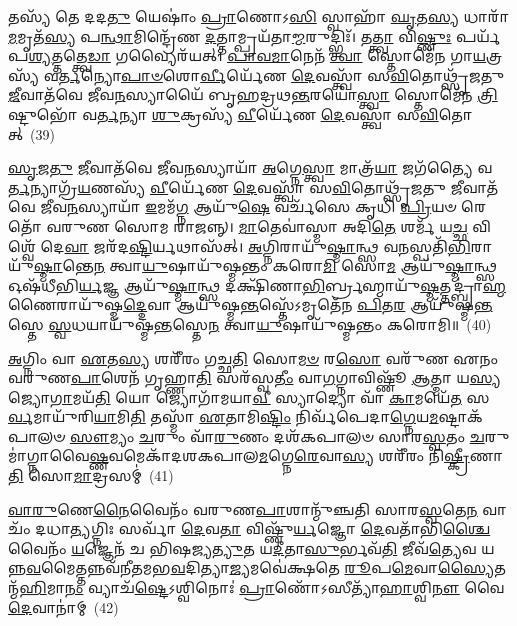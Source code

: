 𑌤𑌸𑍍𑌯᳴ 𑌤𑍇 𑌦𑌦\-\ul{𑌤𑍁} 𑌯𑍇𑌷𑌾𑌂॑ \ul{𑌪𑍍𑌰𑌾}\-𑌣𑍋\-𑌽\-\ul{𑌸𑌿} 𑌸𑍍𑌵𑌾𑌹𑌾᳴ \ul{𑌘𑍃}\-𑌤\-\ul{𑌸𑍍𑌯} 𑌧𑌾𑌰𑌾᳴\-\ul{𑌮}\-𑌮𑍃𑌤᳴\-\ul{𑌸𑍍𑌯} 𑌪\-\ul{𑌨𑍍𑌥𑌾}\-𑌮𑌿𑌨𑍍𑌦𑍍𑌰𑍇᳴𑌣 \ul{𑌦}\-𑌤𑍍𑌤𑌾𑌮𑍍𑌪𑍍𑌰𑌯᳴𑌤𑌾\-\ul{𑌮𑍍𑌮}\-𑌰𑍁𑌦𑍍𑌭𑌿𑌃᳴। 𑌤\-\ul{𑌤𑍍𑌤𑍍𑌵𑌾} 𑌵𑌿\-\ul{𑌷𑍍𑌣𑍁𑌃} 𑌪𑌰𑍍𑌯᳴𑌪\-\ul{𑌶𑍍𑌯}\-𑌤𑍍𑌤𑌤𑍍𑌤𑍍𑌵𑍇\-\ul{𑌡𑌾} 𑌗𑌵𑍍𑌯𑍈𑌰᳴𑌯𑌤𑍍। \ul{𑌪𑌾}\-\-\ul{𑌵}\-\-\ul{𑌮𑌾}\-𑌨𑍇𑌨᳴ \ul{𑌤𑍍𑌵𑌾} 𑌸𑍍𑌤𑍋𑌮𑍇᳴𑌨 𑌗𑌾\-\ul{𑌯}\-𑌤𑍍𑌰𑌸𑍍𑌯᳴ 𑌵\-\ul{𑌰𑍍𑌤}\-𑌨𑍍𑌯𑍋\-\ul{𑌪𑌾}\-\-\ul{𑍞}\-𑌶𑍋\-\ul{𑌰𑍍𑌵𑍀}\-𑌰𑍍𑌯𑍇᳴𑌣 \ul{𑌦𑍇}\-𑌵𑌸𑍍𑌤𑍍𑌵𑌾᳴ 𑌸\-\ul{𑌵𑌿}\-𑌤𑍋𑌥𑍍𑌸𑍃᳴𑌜𑌤𑍁 \ul{𑌜𑍀}\-𑌵𑌾𑌤᳴𑌵𑍇 𑌜𑍀𑌵\-\ul{𑌨}\-𑌸𑍍𑌯𑌾𑌯𑍈᳴ 𑌬𑍃𑌹𑌦𑍍𑌰𑌥\-\ul{𑌨𑍍𑌤}\-𑌰𑌯𑍋॑\-\ul{𑌸𑍍𑌤𑍍𑌵𑌾} 𑌸𑍍𑌤𑍋𑌮𑍇᳴𑌨 \ul{𑌤𑍍𑌰𑌿}\-𑌷𑍍𑌟𑍁𑌭𑍋᳴ 𑌵\-\ul{𑌰𑍍𑌤}\-𑌨𑍍𑌯𑌾 \ul{𑌶𑍁}\-𑌕𑍍𑌰𑌸𑍍𑌯᳴ \ul{𑌵𑍀}\-𑌰𑍍𑌯𑍇᳴𑌣 \ul{𑌦𑍇}\-𑌵𑌸𑍍𑌤𑍍𑌵𑌾᳴ 𑌸\-\ul{𑌵𑌿}\-𑌤𑍋𑌤𑍍~(39)

\-\ul{𑌸𑍃}\-\-\ul{𑌜}\-\-\ul{𑌤𑍁} \ul{𑌜𑍀}\-𑌵𑌾𑌤᳴𑌵𑍇 𑌜𑍀𑌵\-\ul{𑌨}\-𑌸𑍍𑌯𑌾𑌯𑌾᳴ \ul{𑌅}\-𑌗𑍍𑌨𑍇\-\ul{𑌸𑍍𑌤𑍍𑌵𑌾} 𑌮𑌾𑌤𑍍𑌰᳴\-\ul{𑌯𑌾} 𑌜𑌗᳴𑌤𑍍𑌯𑍈 𑌵\-\ul{𑌰𑍍𑌤}\-𑌨𑍍𑌯𑌾𑌗𑍍𑌰᳴\-\ul{𑌯}\-𑌣𑌸𑍍𑌯᳴ \ul{𑌵𑍀}\-𑌰𑍍𑌯𑍇᳴𑌣 \ul{𑌦𑍇}\-𑌵𑌸𑍍𑌤𑍍𑌵𑌾᳴ 𑌸\-\ul{𑌵𑌿}\-𑌤𑍋𑌥𑍍𑌸𑍃᳴𑌜𑌤𑍁 \ul{𑌜𑍀}\-𑌵𑌾𑌤᳴𑌵𑍇 𑌜𑍀𑌵\-\ul{𑌨}\-𑌸𑍍𑌯𑌾𑌯𑌾᳴ \ul{𑌇}\-𑌮𑌮᳴\-\ul{𑌗𑍍𑌨} 𑌆𑌯𑍁᳴\-\ul{𑌷𑍇} 𑌵𑌰𑍍𑌚᳴𑌸𑍇 𑌕𑍃𑌧𑌿 \ul{𑌪𑍍𑌰𑌿}\-𑌯𑍞 𑌰𑍇𑌤𑍋᳴ 𑌵𑌰𑍁𑌣 𑌸𑍋𑌮 𑌰𑌾𑌜𑌨𑍍𑌨𑍍। \ul{𑌮𑌾}\-𑌤𑍇𑌵𑌾॑𑌸𑍍𑌮𑌾 𑌅𑌦𑌿\-\ul{𑌤𑍇} 𑌶𑌰𑍍𑌮᳴ 𑌯\-\ul{𑌚𑍍𑌛} 𑌵𑌿𑌶𑍍𑌵𑍇᳴ 𑌦𑍇\-\ul{𑌵𑌾} 𑌜𑌰᳴𑌦\-\ul{𑌷𑍍𑌟𑌿}\-𑌰𑍍𑌯𑌥𑌾𑌸᳴𑌤𑍍। \ul{𑌅}\-𑌗𑍍𑌨𑌿𑌰𑌾𑌯𑍁᳴\-\ul{𑌷𑍍𑌮𑌾}\-𑌨𑍍𑌥𑍍𑌸 𑌵\-\ul{𑌨}\-𑌸𑍍𑌪𑌤𑌿᳴\-\ul{𑌭𑌿}\-𑌰𑌾𑌯𑍁᳴\-\ul{𑌷𑍍𑌮𑌾}\-𑌨𑍍𑌤𑍇\-\ul{𑌨} 𑌤𑍍𑌵𑌾\-\ul{𑌯𑍁}\-𑌷𑌾𑌯𑍁᳴𑌷𑍍𑌮𑌨𑍍𑌤𑌂 𑌕𑌰𑍋\-\ul{𑌮𑌿} 𑌸𑍋\-\ul{𑌮} 𑌆𑌯𑍁᳴\-\ul{𑌷𑍍𑌮𑌾}\-𑌨𑍍𑌥𑍍𑌸 𑌓𑌷᳴𑌧𑍀𑌭𑌿\-\ul{𑌰𑍍𑌯}\-𑌜𑍍𑌞 𑌆𑌯𑍁᳴\-\ul{𑌷𑍍𑌮𑌾}\-𑌨𑍍𑌥𑍍𑌸 𑌦𑌕𑍍𑌷𑌿᳴𑌣𑌾\-\ul{𑌭𑌿}\-𑌰𑍍𑌬𑍍𑌰𑌹𑍍𑌮𑌾𑌯𑍁᳴\-\ul{𑌷𑍍𑌮}\-𑌤𑍍𑌤𑌦𑍍𑌬𑍍𑌰𑌾॑\-\ul{𑌹𑍍𑌮}\-𑌣𑍈𑌰𑌾𑌯𑍁᳴𑌷𑍍𑌮\-\ul{𑌦𑍍𑌦𑍇}\-𑌵𑌾 𑌆𑌯𑍁᳴𑌷𑍍𑌮\-\ul{𑌨𑍍𑌤}\-𑌸𑍍𑌤𑍇᳴\-𑌽𑌮𑍃𑌤𑍇᳴𑌨 \ul{𑌪𑌿}\-𑌤\-\ul{𑌰} 𑌆𑌯𑍁᳴𑌷𑍍𑌮\-\ul{𑌨𑍍𑌤}\-𑌸𑍍𑌤𑍇 \ul{𑌸𑍍𑌵}\-𑌧𑌯𑌾𑌯𑍁᳴𑌷𑍍𑌮\-\ul{𑌨𑍍𑌤}\-𑌸𑍍𑌤𑍇\-\ul{𑌨} 𑌤𑍍𑌵𑌾\-\ul{𑌯𑍁}\-𑌷𑌾𑌯𑍁᳴𑌷𑍍𑌮𑌨𑍍𑌤𑌂 𑌕𑌰𑍋𑌮𑌿॥~(40)

{\anuvakamend[{𑌵𑌿𑌶𑍍𑌵𑍇᳴𑌷𑌾𑌂 \ul{𑌦𑍇}\-𑌵𑌾𑌨𑌾𑌂॑ \ul{𑌪𑍍𑌰𑌾}\-𑌣𑍋᳴\-𑌽𑌸𑌿 \ul{𑌤𑍍𑌰𑌿}\-𑌷𑍍𑌟𑍁𑌭𑍋᳴ 𑌵\-\ul{𑌰𑍍𑌤}\-𑌨𑍍𑌯𑌾 \ul{𑌶𑍁}\-𑌕𑍍𑌰𑌸𑍍𑌯᳴ \ul{𑌵𑍀}\-𑌰𑍍𑌯𑍇᳴𑌣 \ul{𑌦𑍇}\-𑌵𑌸𑍍𑌤𑍍𑌵𑌾᳴ 𑌸\-\ul{𑌵𑌿}\-𑌤𑍋𑌥𑍍𑌸𑍋\-\ul{𑌮} 𑌆𑌯𑍁᳴\-\ul{𑌷𑍍𑌮𑌾}\-𑌨𑍍𑌪𑌞𑍍𑌚᳴𑌵𑌿𑍞𑌶𑌤𑌿𑌶𑍍𑌚}]}%

\-\ul{𑌅}\-𑌗𑍍𑌨𑌿𑌂 𑌵𑌾 \ul{𑌏}\-𑌤\-\ul{𑌸𑍍𑌯} 𑌶𑌰𑍀᳴𑌰𑌂 𑌗𑌚𑍍𑌛\-\ul{𑌤𑌿} 𑌸𑍋\-\ul{𑌮}\-\-\ul{𑍞} 𑌰\-\ul{𑌸𑍋} 𑌵𑌰𑍁᳴𑌣 𑌏𑌨𑌂 𑌵𑌰𑍁𑌣\-\ul{𑌪𑌾}\-𑌶𑍇𑌨᳴ 𑌗𑍃𑌹𑍍𑌣𑌾\-\ul{𑌤𑌿} 𑌸𑌰᳴𑌸𑍍𑌵\-\ul{𑌤𑍀𑌂} 𑌵𑌾\-\ul{𑌗}\-𑌗𑍍𑌨𑌾𑌵𑌿𑌷𑍍𑌣𑍂᳴ \ul{𑌆}\-𑌤𑍍𑌮𑌾 𑌯\-\ul{𑌸𑍍𑌯} 𑌜𑍍𑌯𑍋\-\ul{𑌗𑌾}\-𑌮𑌯᳴\-\ul{𑌤𑌿} 𑌯𑍋 𑌜𑍍𑌯𑍋𑌗𑌾᳴𑌮𑌯𑌾\-\ul{𑌵𑍀} 𑌸𑍍𑌯𑌾𑌦𑍍𑌯𑍋 𑌵𑌾᳴ \ul{𑌕𑌾}\-𑌮𑌯𑍇᳴\-\ul{𑌤} 𑌸\-\ul{𑌰𑍍𑌵}\-𑌮𑌾𑌯𑍁᳴𑌰𑌿\-\ul{𑌯𑌾}\-𑌮𑌿\-\ul{𑌤𑌿} 𑌤𑌸𑍍𑌮𑌾᳴ \ul{𑌏}\-𑌤𑌾𑌮𑌿\-\ul{𑌷𑍍𑌟𑌿𑌂} 𑌨𑌿𑌰𑍍𑌵᳴𑌪𑍇𑌦𑌾\-\ul{𑌗𑍍𑌨𑍇}\-𑌯\-\ul{𑌮}\-𑌷𑍍𑌟𑌾𑌕᳴𑌪𑌾𑌲𑍞 \ul{𑌸𑍗}\-𑌮𑍍𑌯𑌂 \ul{𑌚}\-𑌰𑍁𑌂 𑌵𑌾᳴\-\ul{𑌰𑍁}\-𑌣𑌂 𑌦𑌶᳴\-𑌕𑌪𑌾𑌲𑍞 𑌸𑌾𑌰\-\ul{𑌸𑍍𑌵}\-𑌤𑌂 \ul{𑌚}\-𑌰𑍁𑌮𑌾॑𑌗𑍍𑌨𑌾𑌵𑍈\-\ul{𑌷𑍍𑌣}\-𑌵𑌮𑍇𑌕𑌾᳴\-𑌦𑌶\-𑌕𑌪𑌾𑌲\-\ul{𑌮}\-𑌗𑍍𑌨𑍇\-\ul{𑌰𑍇}\-𑌵𑌾\-\ul{𑌸𑍍𑌯} 𑌶𑌰𑍀᳴𑌰𑌂 𑌨𑌿\-\ul{𑌷𑍍𑌕𑍍𑌰𑍀}\-𑌣𑌾\-\ul{𑌤𑌿} 𑌸𑍋\-\ul{𑌮𑌾}\-𑌦𑍍𑌰𑌸𑌮𑍍॑~(41)

\-\ul{𑌵𑌾}\-\-\ul{𑌰𑍁}\-𑌣𑍇\-\ul{𑌨𑍈}\-𑌵𑍈𑌨𑌂᳴ 𑌵𑌰𑍁𑌣\-\ul{𑌪𑌾}\-𑌶𑌾𑌨𑍍𑌮𑍁᳴𑌞𑍍𑌚𑌤𑌿 𑌸𑌾𑌰\-\ul{𑌸𑍍𑌵}\-𑌤𑍇\-\ul{𑌨} 𑌵𑌾𑌚𑌂᳴ 𑌦𑌧𑌾\-\ul{𑌤𑍍𑌯}\-𑌗𑍍𑌨𑌿𑌃 𑌸𑌰𑍍𑌵𑌾᳴ \ul{𑌦𑍇}\-𑌵\-\ul{𑌤𑌾} 𑌵𑌿𑌷𑍍𑌣𑍁᳴\-\ul{𑌰𑍍𑌯}\-𑌜𑍍𑌞𑍋 \ul{𑌦𑍇}\-𑌵𑌤𑌾᳴𑌭𑌿\-\ul{𑌶𑍍𑌚𑍈}\-𑌵𑍈𑌨𑌂᳴ \ul{𑌯}\-𑌜𑍍𑌞𑍇𑌨᳴ 𑌚 𑌭𑌿𑌷𑌜𑍍𑌯\-\ul{𑌤𑍍𑌯𑍁}\-𑌤 𑌯\-\ul{𑌦𑍀}\-𑌤𑌾\-\ul{𑌸𑍁}\-𑌰𑍍𑌭𑌵᳴\-\ul{𑌤𑌿} 𑌜𑍀𑌵᳴\-\ul{𑌤𑍍𑌯𑍇}\-𑌵 𑌯𑌨𑍍𑌨\-\ul{𑌵}\-𑌮𑍈𑌤𑍍𑌤𑌨𑍍𑌨𑌵᳴𑌨𑍀𑌤𑌮𑌭\-\ul{𑌵}\-𑌦𑌿𑌤𑍍𑌯𑌾\-\ul{𑌜𑍍𑌯}\-𑌮𑌵𑍇॑𑌕𑍍𑌷𑌤𑍇 \ul{𑌰𑍂}\-𑌪\-\ul{𑌮𑍇}\-𑌵𑌾\-\ul{𑌸𑍍𑌯𑍈}\-𑌤𑌨𑍍𑌮᳴\-\ul{𑌹𑌿}\-𑌮𑌾\-\ul{𑌨𑌂} 𑌵𑍍𑌯𑌾𑌚᳴\-\ul{𑌷𑍍𑌟𑍇}\-\-𑌽𑌶𑍍𑌵𑌿𑌨𑍋𑌃॑ \ul{𑌪𑍍𑌰𑌾}\-𑌣𑍋᳴\-𑌽𑌸𑍀𑌤𑍍𑌯𑌾᳴\-\ul{𑌹𑌾}\-𑌶𑍍𑌵𑌿\-\ul{𑌨𑍗} 𑌵𑍈 \ul{𑌦𑍇}\-𑌵𑌾𑌨𑌾॑𑌮𑍍~(42)

